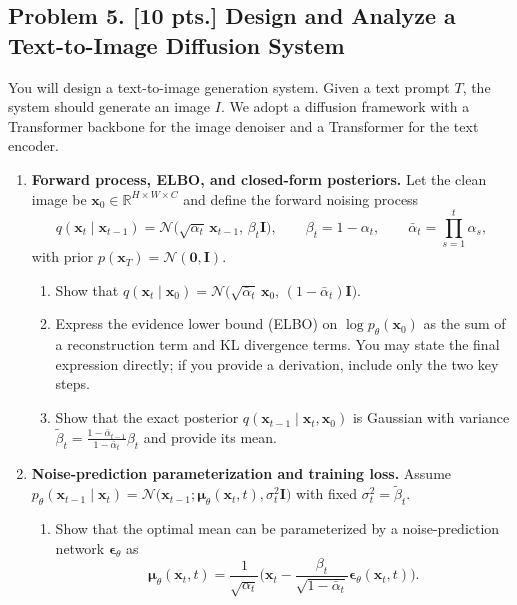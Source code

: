 \documentclass[11pt,a4paper]{article}
\begin{document}
\subsection{Problem 5. [10 pts.] Design and Analyze a Text-to-Image Diffusion System}
You will design a text-to-image generation system. Given a text prompt $T$, the system should generate an image $I$. We adopt a diffusion framework with a Transformer backbone for the image denoiser and a Transformer for the text encoder.
\begin{enumerate}[label=(\alph*)]
    \item \textbf{Forward process, ELBO, and closed-form posteriors.} Let the clean image be $\mathbf{x}_0 \in \mathbb{R}^{H \times W \times C}$ and define the forward noising process
    \[
    q(\mathbf{x}_t \mid \mathbf{x}_{t-1}) = \mathcal{N}\bigl(\sqrt{\alpha_t}\, \mathbf{x}_{t-1},\, \beta_t \mathbf{I}\bigr), \qquad \beta_t = 1 - \alpha_t, \qquad \bar{\alpha}_t = \prod_{s=1}^{t} \alpha_s,
    \]
    with prior $p(\mathbf{x}_T) = \mathcal{N}(\mathbf{0}, \mathbf{I})$.
    \begin{enumerate}[label=(\roman*)]
        \item Show that $q(\mathbf{x}_t \mid \mathbf{x}_0) = \mathcal{N}\bigl(\sqrt{\bar{\alpha}_t}\, \mathbf{x}_0,\, (1 - \bar{\alpha}_t)\mathbf{I}\bigr)$.
        \item Express the evidence lower bound (ELBO) on $\log p_{\theta}(\mathbf{x}_0)$ as the sum of a reconstruction term and KL divergence terms. You may state the final expression directly; if you provide a derivation, include only the two key steps.
        \item Show that the exact posterior $q(\mathbf{x}_{t-1} \mid \mathbf{x}_t, \mathbf{x}_0)$ is Gaussian with variance $\tilde{\beta}_t = \frac{1 - \bar{\alpha}_{t-1}}{1 - \bar{\alpha}_t} \beta_t$ and provide its mean.
    \end{enumerate}
    \item \textbf{Noise-prediction parameterization and training loss.} Assume $p_{\theta}(\mathbf{x}_{t-1} \mid \mathbf{x}_t) = \mathcal{N}\bigl(\mathbf{x}_{t-1}; \boldsymbol{\mu}_{\theta}(\mathbf{x}_t, t), \sigma_t^{2} \mathbf{I}\bigr)$ with fixed $\sigma_t^{2} = \tilde{\beta}_t$.
    \begin{enumerate}[label=(\roman*)]
        \item Show that the optimal mean can be parameterized by a noise-prediction network $\boldsymbol{\epsilon}_{\theta}$ as
        \[
        \boldsymbol{\mu}_{\theta}(\mathbf{x}_t, t) = \frac{1}{\sqrt{\alpha_t}} \Biggl( \mathbf{x}_t - \frac{\beta_t}{\sqrt{1 - \bar{\alpha}_t}} \boldsymbol{\epsilon}_{\theta}(\mathbf{x}_t, t) \Biggr).
\]
\end{enumerate}
\end{enumerate}
\end{document}
